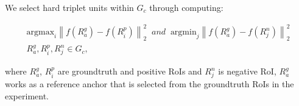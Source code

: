 \documentclass{article}
\begin{document}
{We select hard triplet units within $G_c$ through computing:
\begin{small}
\begin{equation}
\begin{array}{cl}
\text{argmax}_i{\left \| f(R_a^g)\!-\!f(R_i^p)\right \|}^2_2 \;\; and \;\; \text{argmin}_j{\left \| f(R_a^g)\!-\!f(R_j^n)\right \|}^2_2 \\
R_a^g, R_i^p, R_j^n \in G_c,
\end{array}
\label{eq7}
\end{equation}
\end{small}
where $R_a^g$, $R_i^p$ are groundtruth and positive RoIs and $R_j^n$ is negative RoI, $R_a^g$ works as a reference anchor that is selected from the groundtruth RoIs in the experiment.

\begin {table*}[!ht]
\label{tab:detection}
\scriptsize
\centering
\renewcommand\arraystretch{1.1}
\begin{tabular}{p{2.25cm}|p{0.85cm}|p{0.35cm}|p{0.22cm}p{0.22cm}p{0.22cm}p{0.23cm}p{0.22cm}p{0.21cm}p{0.21cm}p{0.21cm}p{0.23cm}p{0.23cm}p{0.23cm}p{0.23cm}p{0.23cm}p{0.23cm}p{0.23cm}p{0.23cm}p{0.23cm}p{0.23cm}p{0.22cm}p{0.21cm}}


\end{tabular}
\end{table*}}
\end{document}
